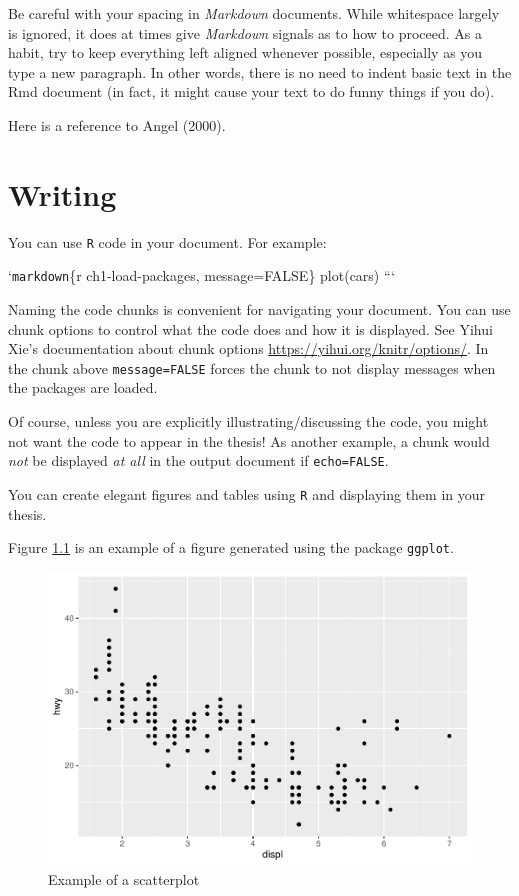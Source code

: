 \documentclass[
11pt, %
oneside, %
english, %
singlespacing, %
]{macthesis} %
\begin{document}
Be careful with your spacing in \emph{Markdown} documents. While whitespace largely is ignored, it does at times give \emph{Markdown} signals as to how to proceed. As a habit, try to keep everything left aligned whenever possible, especially as you type a new paragraph. In other words, there is no need to indent basic text in the Rmd document (in fact, it might cause your text to do funny things if you do).

Here is a reference to Angel (2000).

\chapter{Writing}\label{writing}

You can use \texttt{R} code in your document. For example:

`\texttt{markdown}\{r ch1-load-packages, message=FALSE\}
plot(cars)
```

Naming the code chunks is convenient for navigating your document. You can use chunk options to control what the code does and how it is displayed. See Yihui Xie's documentation about chunk options \url{https://yihui.org/knitr/options/}. In the chunk above \texttt{message=FALSE} forces the chunk to not display messages when the packages are loaded.

Of course, unless you are explicitly illustrating/discussing the code, you might not want the code to appear in the thesis! As another example, a chunk would \emph{not} be displayed \emph{at all} in the output document if \texttt{echo=FALSE}.

You can create elegant figures and tables using \texttt{R} and displaying them in your thesis.

Figure \ref{fig:ch1-scatterplot} is an example of a figure generated using the package \texttt{ggplot}.

\begin{figure}
\includegraphics[width=0.8\linewidth]{thesis_files/figure-latex/ch1-scatterplot-1} \caption{\label{fig:ch1-scatterplot}Example of a scatterplot}\label{fig:ch1-scatterplot}
\end{figure}
\end{document}
